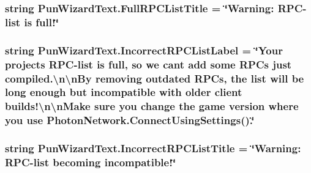 \subsubsection[{\texorpdfstring{Full\+R\+P\+C\+List\+Title}{FullRPCListTitle}}]{\setlength{\rightskip}{0pt plus 5cm}string Pun\+Wizard\+Text.\+Full\+R\+P\+C\+List\+Title = \char`\"{}Warning\+: R\+PC-\/list is full!\char`\"{}}\hypertarget{class_pun_wizard_text_a7d39669365eb40c15a25f1bf842d6b68}{}\label{class_pun_wizard_text_a7d39669365eb40c15a25f1bf842d6b68}
\subsubsection[{\texorpdfstring{Incorrect\+R\+P\+C\+List\+Label}{IncorrectRPCListLabel}}]{\setlength{\rightskip}{0pt plus 5cm}string Pun\+Wizard\+Text.\+Incorrect\+R\+P\+C\+List\+Label = \char`\"{}Your project\textquotesingle{}s R\+PC-\/list is full, so we can\textquotesingle{}t add some R\+P\+Cs just compiled.\textbackslash{}n\textbackslash{}n\+By removing outdated R\+P\+Cs, the list will be long enough but incompatible with older client builds!\textbackslash{}n\textbackslash{}n\+Make sure you change the game version where you use {\bf Photon\+Network.\+Connect\+Using\+Settings}().\char`\"{}}\hypertarget{class_pun_wizard_text_ad9f6dfd3a6fbb40839917b1993cdf368}{}\label{class_pun_wizard_text_ad9f6dfd3a6fbb40839917b1993cdf368}
\subsubsection[{\texorpdfstring{Incorrect\+R\+P\+C\+List\+Title}{IncorrectRPCListTitle}}]{\setlength{\rightskip}{0pt plus 5cm}string Pun\+Wizard\+Text.\+Incorrect\+R\+P\+C\+List\+Title = \char`\"{}Warning\+: R\+PC-\/list becoming incompatible!\char`\"{}}\hypertarget{class_pun_wizard_text_aa1fdd0087b794699ee957c122901e9cf}{}\label{class_pun_wizard_text_aa1fdd0087b794699ee957c122901e9cf}
